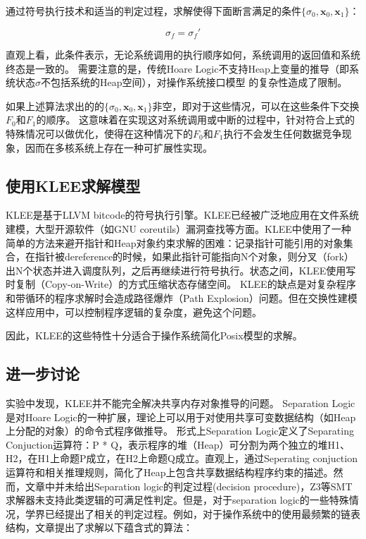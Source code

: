 通过符号执行技术和适当的判定过程，求解使得下面断言满足的条件$\{\sigma_0,\boldsymbol{x}_0,
\boldsymbol{x}_1\}$：

\begin{equation}
\label{eq:hoare4}
\sigma_f = \sigma_f'
\end{equation}

直观上看，此条件表示，无论系统调用的执行顺序如何，系统调用的返回值和系统终态是一致的。
需要注意的是，传统Hoare
Logic不支持Heap上变量的推导（即系统状态$\sigma$不包括系统的Heap空间），对操作系统接口模型
的复杂性造成了限制。

如果上述算法求出的的$\{\sigma_0,\boldsymbol{x}_0,
\boldsymbol{x}_1\}$非空，即对于这些情况，可以在这些条件下交换$F_0$和$F_1$的顺序。
这意味着在实现这对系统调用或中断的过程中，针对符合上式的特殊情况可以做优化，使得在这种情况下的$F_0$和$F_1$执行不会发生任何数据竞争现象，因而在多核系统上存在一种可扩展性实现。



\subsection{使用KLEE求解模型}
KLEE是基于LLVM
bitcode的符号执行引擎。KLEE已经被广泛地应用在文件系统建模，大型开源软件（如GNU
coreutils）漏洞查找\cite{Cadar:2008:KUA:1855741.1855756}等方面。KLEE中使用了一种简单的方法来避开指针和Heap对象约束求解的困难：记录指针可能引用的对象集合，在指针被dereference的时候，如果此指针可能指向N个对象，则分叉（fork）出N个状态并进入调度队列，之后再继续进行符号执行。状态之间，KLEE使用写时复制（Copy-on-Write）的方式压缩状态存储空间。
KLEE的缺点是对复杂程序和带循环的程序求解时会造成路径爆炸（Path
Explosion）问题。但在交换性建模这样应用中，可以控制程序逻辑的复杂度，避免这个问题。

因此，KLEE的这些特性十分适合于操作系统简化Posix模型的求解。


\subsection{进一步讨论}

实验中发现，KLEE并不能完全解决共享内存对象推导的问题。
Separation Logic是对Hoare
Logic的一种扩展，理论上可以用于对使用共享可变数据结构（如Heap上分配的对象）的命令式程序做推导\cite{Reynolds:2002:SLL:645683.664578}。
形式上Separation Logic定义了Separating Conjuction运算符：P *
Q，表示程序的堆（Heap）可分割为两个独立的堆H1、H2，在H1上命题P成立，在H2上命题Q成立。直观上，通过Seperating
conjuction运算符和相关推理规则，简化了Heap上包含共享数据结构程序约束的描述。然而，文章\cite{Reynolds:2002:SLL:645683.664578}中并未给出Separation
logic的判定过程(decision
procedure)，Z3等SMT求解器未支持此类逻辑的可满足性判定。但是，对于separation
logic的一些特殊情况，学界已经提出了相关的判定过程。例如，对于操作系统中的使用最频繁的链表结构，文章\cite{seplogic:theorem}提出了求解以下蕴含式的算法：

